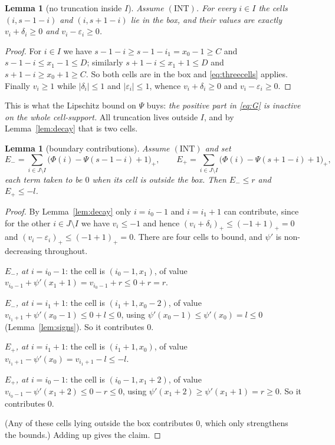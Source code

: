 \documentclass[11pt]{article}
\newtheorem{lemma}[theorem]{Lemma}
\theoremstyle{definition}
\newcommand{\INT}{(\mathrm{INT})}
\begin{document}
\begin{lemma}[no truncation inside $I$]\label{lem:notrunc}
Assume $\INT$. For every $i\in I$ the cells $(i,s-1-i)$ and $(i,s+1-i)$ lie in the box,
and their values are exactly $v_i+\delta_i\ge0$ and $v_i-\varepsilon_i\ge0$.
\end{lemma}
\begin{proof}
For $i\in I$ we have $s-1-i\ge s-1-i_1=x_0-1\ge C$ and $s-1-i\le x_1-1\le D$; similarly
$s+1-i\le x_1+1\le D$ and $s+1-i\ge x_0+1\ge C$. So both cells are in the box and
\eqref{eq:threecells} applies. Finally $v_i\ge1$ while
$|\delta_i|\le1$ and $|\varepsilon_i|\le1$, whence $v_i+\delta_i\ge0$ and
$v_i-\varepsilon_i\ge0$.
\end{proof}

This is what the Lipschitz bound on $\Psi$ buys: \emph{the positive part in \eqref{eq:G}
is inactive on the whole cell-support.} All truncation lives outside $I$, and by
Lemma~\ref{lem:decay} that is two cells.

\begin{lemma}[boundary contributions]\label{lem:bdry}
Assume $\INT$ and set
\[
 E_-=\!\!\sum_{i\in J\setminus I}\!\!\bigl(\Phi(i)-\Psi(s-1-i)+1\bigr)_+,\qquad
 E_+=\!\!\sum_{i\in J\setminus I}\!\!\bigl(\Phi(i)-\Psi(s+1-i)+1\bigr)_+ ,
\]
each term taken to be $0$ when its cell is outside the box. Then
$E_-\le r$ and $E_+\le -l$.
\end{lemma}
\begin{proof}
By Lemma~\ref{lem:decay} only $i=i_0-1$ and $i=i_1+1$ can contribute, since for the
other $i\in J\setminus I$ we have $v_i\le-1$ and hence
$(v_i+\delta_i)_+\le(-1+1)_+=0$ and $(v_i-\varepsilon_i)_+\le(-1+1)_+=0$.
There are four cells to bound, and $\psi'$ is non-decreasing throughout.

\emph{$E_-$, at $i=i_0-1$}: the cell is $(i_0-1,x_1)$, of value
$v_{i_0-1}+\psi'(x_1+1)=v_{i_0-1}+r\le 0+r=r$.

\emph{$E_-$, at $i=i_1+1$}: the cell is $(i_1+1,x_0-2)$, of value
$v_{i_1+1}+\psi'(x_0-1)\le 0+l\le0$, using $\psi'(x_0-1)\le\psi'(x_0)=l\le0$
(Lemma~\ref{lem:signs}). So it contributes $0$.

\emph{$E_+$, at $i=i_1+1$}: the cell is $(i_1+1,x_0)$, of value
$v_{i_1+1}-\psi'(x_0)=v_{i_1+1}-l\le -l$.

\emph{$E_+$, at $i=i_0-1$}: the cell is $(i_0-1,x_1+2)$, of value
$v_{i_0-1}-\psi'(x_1+2)\le 0-r\le0$, using $\psi'(x_1+2)\ge\psi'(x_1+1)=r\ge0$. So it
contributes $0$.

(Any of these cells lying outside the box contributes $0$, which only strengthens the
bounds.) Adding up gives the claim.
\end{proof}
\end{document}
